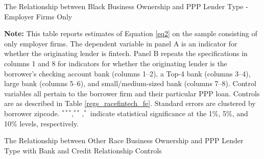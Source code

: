 \documentclass[11pt]{article}
\begin{document}
\newpage
\begin{table}[H]
	\caption{The Relationship between Black Business Ownership and PPP Lender Type - Employer Firms Only} \label{regs_racefintech_fe_emp}
	\begin{adjustbox}{width=\linewidth}
		
	\end{adjustbox}
	
	\begin{adjustbox}{width=\linewidth}
		
	\end{adjustbox}

	\begin{minipage}{\textwidth} \medskip
		\footnotesize{{\bf Note: }This table reports estimates of Equation \ref{eq2} on the sample consisting of only employer firms. The dependent variable in panel A is an indicator for whether the originating lender is fintech. Panel B repeats the specifications in columns 1 and 8 for indicators for whether the originating lender is the borrower's checking account bank (columns 1--2), a Top-4 bank (columns 3--4), large bank (columns 5--6), and small/medium-sized bank (columns 7--8). Control variables all pertain to the borrower firm and their particular PPP loan. Controls are as described in Table \ref{regs_racefintech_fe}. Standard errors are clustered by borrower zipcode. $^{***}, ^{**}, ^{*}$ indicate statistical significance at the 1\%, 5\%, and 10\% levels, respectively.}
	\end{minipage}
\end{table}


\newpage 
    \begin{table}[H]
    	\caption{The Relationship between Other Race Business Ownership and PPP Lender Type with Bank and Credit Relationship Controls} \label{white_racefintech}
  	    \begin{adjustbox}{width=\linewidth, center}
            
  	    \end{adjustbox}
    \end{table} 
\end{document}
